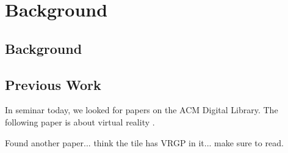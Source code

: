 \chapter{Background}
\label{chap:background}

\section{Background}

\section{Previous Work}

In seminar today, we looked for papers on the ACM Digital Library. The following paper is about virtual reality \cite{Kreylos:2006:ESW:1128923.1128948}.

Found another paper... think the tile has VRGP in it... make sure to read.



